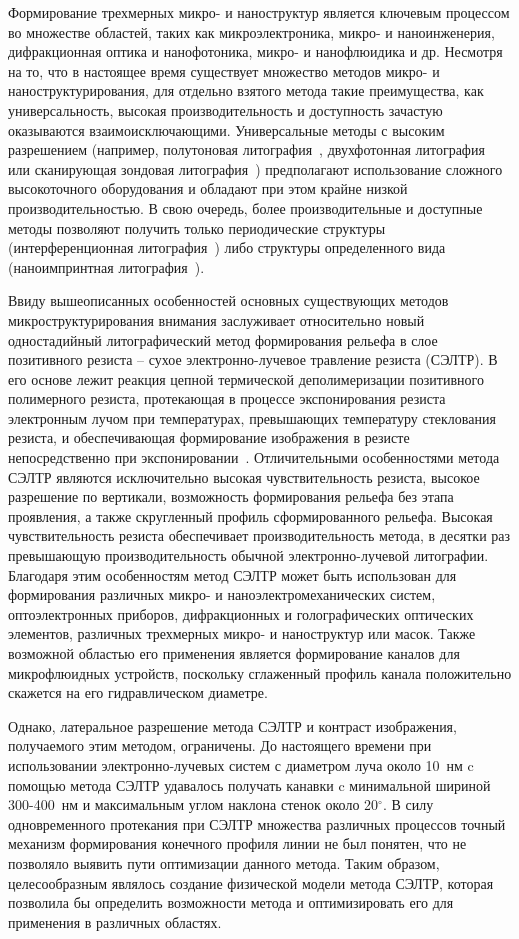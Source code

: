 \actuality
Формирование трехмерных микро- и наноструктур является ключевым процессом во множестве областей, таких как микроэлектроника, микро- и наноинженерия, дифракционная оптика и нанофотоника, микро- и нанофлюидика и др. Несмотря на то, что в настоящее время существует множество методов микро- и наноструктурирования, для отдельно взятого метода такие преимущества, как универсальность, высокая производительность и доступность зачастую оказываются взаимоисключающими. Универсальные методы с высоким разрешением (например, полутоновая литография~\cite{GL_general}, двухфотонная литография~\cite{TPL_castle} или сканирующая зондовая литография~\cite{SPL_mechanical}) предполагают использование сложного высокоточного оборудования и обладают при этом крайне низкой производительностью. В свою очередь, более производительные и доступные методы позволяют получить только периодические структуры (интерференционная литография~\cite{IL_metamaterials}) либо структуры определенного вида (наноимпринтная литография~\cite{NIL_1}).

Ввиду вышеописанных особенностей основных существующих методов микроструктурирования внимания заслуживает относительно новый одностадийный литографический метод формирования рельефа в слое позитивного резиста -- сухое электронно-лучевое травление резиста (СЭЛТР). В его основе лежит реакция цепной термической деполимеризации позитивного полимерного резиста, протекающая  в процессе экспонирования резиста электронным лучом при температурах, превышающих температуру стеклования резиста, и обеспечивающая формирование изображения в резисте непосредственно при экспонировании~\cite{Bruk_2013, Bruk_2016_mee}. Отличительными особенностями метода СЭЛТР являются исключительно высокая чувствительность резиста, высокое разрешение по вертикали, возможность формирования рельефа без этапа проявления, а также скругленный профиль сформированного рельефа. Высокая чувствительность резиста обеспечивает производительность метода, в десятки раз превышающую производительность обычной электронно-лучевой литографии. Благодаря этим особенностям метод СЭЛТР может быть использован для формирования различных микро- и наноэлектромеханических систем, оптоэлектронных приборов, дифракционных и голографических оптических элементов, различных трехмерных микро- и наноструктур или масок. Также возможной областью его применения является формирование каналов для микрофлюидных устройств, поскольку сглаженный профиль канала положительно скажется на его гидравлическом диаметре.

Однако, латеральное разрешение метода СЭЛТР и контраст изображения, получаемого этим методом, ограничены. До настоящего времени при использовании электронно-лучевых систем с диаметром луча около 10~нм c помощью метода СЭЛТР удавалось получать канавки c минимальной шириной 300-400~нм и максимальным углом наклона стенок около 20$^\circ$. В силу одновременного протекания при СЭЛТР множества различных процессов точный механизм формирования конечного профиля линии не был понятен, что не позволяло выявить пути оптимизации данного метода. Таким образом, целесообразным являлось создание физической модели метода СЭЛТР, которая позволила бы определить возможности метода и оптимизировать его для применения в различных областях.


